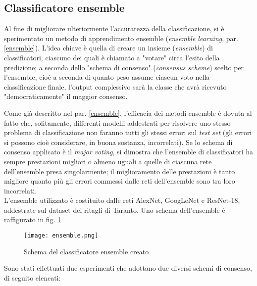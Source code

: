 \subsection{Classificatore ensemble}
\label{classEnsemble}
Al fine di migliorare ulteriormente l'accuratezza della classificazione, si è sperimentato un metodo di apprendimento ensemble (\textit{ensemble learning}, par. \ref{ensemble}). L'idea chiave è quella di creare un insieme (\textit{ensemble}) di classificatori, ciascuno dei quali è chiamato a "votare" circa l'esito della predizione; a seconda dello "schema di consenso" (\textit{consensus scheme}) scelto per l'ensemble, cioè a seconda di quanto peso assume ciascun voto nella classificazione finale, l'output complessivo sarà la classe che avrà ricevuto "democraticamente" il maggior consenso.

Come già descritto nel par. \ref{ensemble}, l'efficacia dei metodi ensemble è dovuta al fatto che, solitamente, differenti modelli  addestrati per risolvere uno stesso problema di classificazione non faranno tutti gli stessi errori sul \textit{test set} (gli errori si possono cioè considerare, in buona sostanza, incorrelati). Se lo schema di consenso applicato è il \textit{major voting}, si dimostra che l'ensemble di classificatori ha sempre prestazioni migliori o almeno uguali a quelle di ciascuna rete dell'ensemble presa singolarmente; il miglioramento delle prestazioni è tanto migliore quanto più gli errori commessi dalle reti dell'ensemble sono tra loro incorrelati.\cite{dlbook}\cite{ensembles}\\

\noindent L'ensemble utilizzato è costituito dalle reti AlexNet, GoogLeNet e ResNet-18, addestrate sul dataset dei ritagli di Taranto. Uno schema dell'ensemble è raffigurato in fig. \ref{fig:ensemble}

\begin{figure}[h]
\centering
\texttt{[image: ensemble.png]}
\caption{Schema del classificatore ensemble creato}
\label{fig:ensemble}
\end{figure}

Sono stati effettuati due esperimenti che adottano due diversi schemi di consenso, di seguito elencati:

